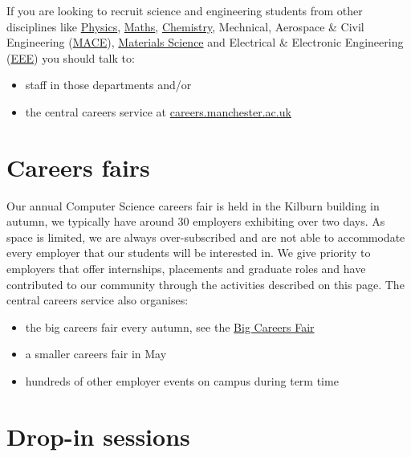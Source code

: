 \documentclass[
  12pt,
]{book}
\providecommand{\tightlist}{%
  \setlength{\itemsep}{0pt}\setlength{\parskip}{0pt}}
\begin{document}
If you are looking to recruit science and engineering students from other disciplines like \href{https://www.physics.manchester.ac.uk/}{Physics}, \href{https://www.maths.manchester.ac.uk/}{Maths}, \href{https://www.chemistry.manchester.ac.uk/}{Chemistry}, Mechnical, Aerospace \& Civil Engineering (\href{https://www.mace.manchester.ac.uk/}{MACE}), \href{https://www.materials.manchester.ac.uk/}{Materials Science} and Electrical \& Electronic Engineering (\href{https://www.eee.manchester.ac.uk/}{EEE}) you should talk to:

\begin{itemize}
\tightlist
\item
  staff in those departments and/or\\
\item
  the central careers service at \href{http://www.careers.manchester.ac.uk/}{careers.manchester.ac.uk}
\end{itemize}

\hypertarget{careersfairs}{%
\section{Careers fairs}\label{careersfairs}}

Our annual Computer Science careers fair is held in the Kilburn building in autumn, we typically have around 30 employers exhibiting over two days. As space is limited, we are always over-subscribed and are not able to accommodate every employer that our students will be interested in. We give priority to employers that offer internships, placements and graduate roles and have contributed to our community through the activities described on this page. The central careers service also organises:

\begin{itemize}
\tightlist
\item
  the big careers fair every autumn, see the \href{http://www.careers.manchester.ac.uk/events/bigcareersfair/}{Big Careers Fair}
\item
  a smaller careers fair in May
\item
  hundreds of other employer events on campus during term time \citep{highfliers2020}
\end{itemize}

\hypertarget{dropins}{%
\section{Drop-in sessions}\label{dropins}}
\end{document}
